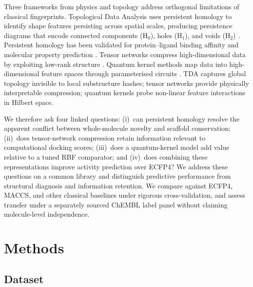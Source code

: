 \documentclass[11pt,a4paper]{article}
\begin{document}
Three frameworks from physics and topology address orthogonal limitations of classical fingerprints. Topological Data Analysis uses persistent homology to identify shape features persisting across spatial scales, producing persistence diagrams that encode connected components (H$_0$), holes (H$_1$), and voids (H$_2$) \citep{tda_review_2025}. Persistent homology has been validated for protein--ligand binding affinity \citep{tda_binding_affinity_2026} and molecular property prediction \citep{tda_pretraining_2026}. Tensor networks compress high-dimensional data by exploiting low-rank structure \citep{tensornet_2023,tn_efficient_2026}. Quantum kernel methods map data into high-dimensional feature spaces through parameterised circuits \citep{qml_review_2026,pqc_chemistry_2026}. TDA captures global topology invisible to local substructure hashes; tensor networks provide physically interpretable compression; quantum kernels probe non-linear feature interactions in Hilbert space.

We therefore ask four linked questions: (i)~can persistent homology resolve the apparent conflict between whole-molecule novelty and scaffold conservation; (ii)~does tensor-network compression retain information relevant to computational docking scores; (iii)~does a quantum-kernel model add value relative to a tuned RBF comparator; and (iv)~does combining these representations improve activity prediction over ECFP4? We address these questions on a common library and distinguish predictive performance from structural diagnosis and information retention. We compare against ECFP4, MACCS, and other classical baselines under rigorous cross-validation, and assess transfer under a separately sourced ChEMBL label panel without claiming molecule-level independence.


\section{Methods}

\subsection{Dataset}
\end{document}
